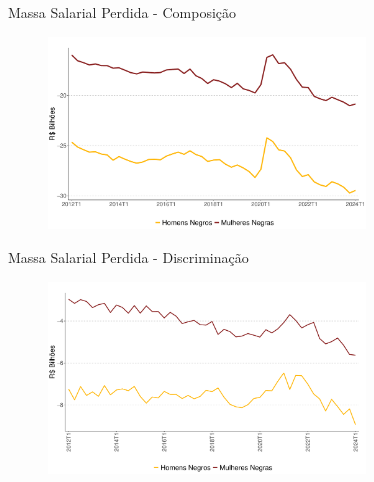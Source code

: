 \documentclass[10pt, xcolor=x11names,compress]{beamer}
\begin{document}
        	\begin{frame}{Massa Salarial Perdida - Composição}
    	\begin{figure}
    		\centering
    		\includegraphics[width = 0.75\textwidth]{figures_output/perda_salarial_genero_raca.pdf}
    	\end{figure}
    \end{frame}

        	\begin{frame}{Massa Salarial Perdida - Discriminação}
	\begin{figure}
		\centering
		\includegraphics[width = 0.75\textwidth]{figures_output/perda_salarial_discr_genero_raca.pdf}
	\end{figure}
\end{frame}
\end{document}
